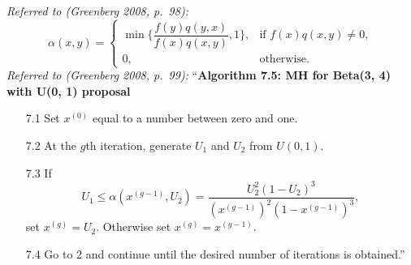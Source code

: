 \documentclass[11pt,a4paper]{article}
\numberwithin{equation}{questao}   %
\newcommand{\1}{\mathbf{1}}
\begin{document}
\emph{Referred to (Greenberg 2008, p.~98):}
\[
\alpha(x,y)=\begin{cases}\min\Big\{\dfrac{f(y)q(y,x)}{f(x)q(x,y)},1\Big\}, & \text{if } f(x)q(x,y)\neq0,\\[8pt] 0, & \text{otherwise.}\end{cases}\tag{7.6}
\]
\emph{Referred to (Greenberg 2008, p.~99):} ``\textbf{Algorithm 7.5: MH for Beta(3, 4) with U(0, 1) proposal}
\begin{itemize}[leftmargin=2.6em]
\item[7.1] Set $x^{(0)}$ equal to a number between zero and one.
\item[7.2] At the $g$th iteration, generate $U_1$ and $U_2$ from $U(0,1)$.
\item[7.3] If
\[
U_1\le\alpha(x^{(g-1)},U_2)=\frac{U_2^2(1-U_2)^3}{(x^{(g-1)})^2(1-x^{(g-1)})^3},
\]
set $x^{(g)}=U_2$. Otherwise set $x^{(g)}=x^{(g-1)}$.
\item[7.4] Go to 2 and continue until the desired number of iterations is obtained.''
\end{itemize}
\end{document}
